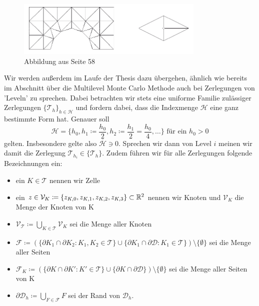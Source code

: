 \begin{figure}[H]
	\centering
	\includegraphics[width=0.8\textwidth]{triangulierung.png} \\
	Abbildung aus \cite{braess2013finite} Seite 58
\end{figure}
Wir werden außerdem im Laufe der Thesis dazu übergehen, ähnlich wie bereits im Abschnitt über die Multilevel Monte Carlo Methode auch bei Zerlegungen von 'Leveln' zu sprechen. Dabei betrachten wir stets eine uniforme Familie zulässiger Zerlegungen $ \{\mathcal{T}_h\}_{h \in \mathcal{H}} $ und fordern dabei, dass die Indexmenge $ \mathcal{H} $ eine ganz bestimmte Form hat. Genauer soll \[ \mathcal{H} = \{ h_0 , h_1 \coloneqq \frac{h_0}{2},h_2 \coloneqq \frac{h_1}{2} = \frac{h_0}{4}, \dots \}  \text{ für ein }  h_0 > 0  \] gelten. Insbesondere gelte also $ \overline{\mathcal{H}} \ni 0 $. Sprechen wir dann von Level $ i $ meinen wir damit die Zerlegung $\mathcal{T}_{h_i} \in \{\mathcal{T}_h\}$.
Zudem führen wir für alle Zerlegungen folgende Bezeichnungen ein:
\begin{itemize}
	\item ein $ K \in \mathcal{T} $ nennen wir Zelle
	\item ein $ z \in \mathcal{V}_K \coloneqq \{ z_{K,0} , z_{K,1} , z_{K,2}, z_{K,3}\} \subset \mathbb{R}^2 $ nennen wir Knoten und $\mathcal{V}_K$ die Menge der Knoten von K
	\item $ \mathcal{V}_{\mathcal{T}} \coloneqq \bigcup_{K \in \mathcal{T}} \mathcal{V}_K $ sei die Menge aller Knoten
	\item $\mathcal{F}  \coloneqq (\{ \partial K_1 \cap \partial K_2 : K_1,K_2 \in \mathcal{T} \} \cup \{ \partial K_1 \cap \partial \mathcal{D} : K_1 \in \mathcal{T} \}) \setminus \{\emptyset\} $ sei die Menge aller Seiten
	\item $ \mathcal{F}_K \coloneqq (\{ \partial K \cap \partial K' : K' \in \mathcal{T} \} \cup \{ \partial K \cap \partial \mathcal{D} \}) \setminus \{ \emptyset \} $ sei die Menge aller Seiten von K 
	\item $ \partial \mathcal{D}_h \coloneqq \bigcup_{F \in \mathcal{F}} F $ sei der Rand von $ \mathcal{D}_h $.
\end{itemize}

